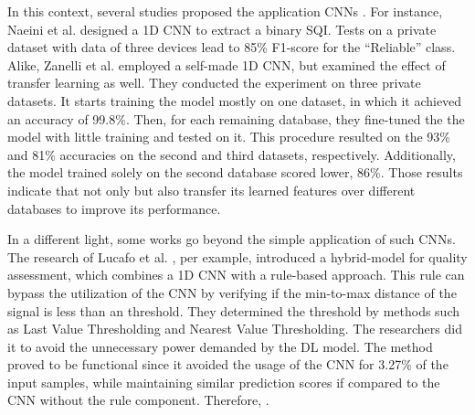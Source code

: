 In this context, several studies proposed the application \glspl{CNN} . For instance, Naeini et al. \cite{deep-learning-1} designed a 1D \gls{CNN} to extract a binary \gls{SQI}. Tests on a private dataset with data of three devices lead to 85\% F1-score for the ``Reliable'' class. Alike, Zanelli et al. \cite{deep-learning-2} employed a self-made 1D \gls{CNN}, but examined the effect of transfer learning as well. They conducted the experiment on three private datasets. It starts training the model mostly on one dataset, in which it achieved an accuracy of 99.8\%. Then, for each remaining database, they fine-tuned the the model with little training and tested on it. This procedure resulted on the 93\% and 81\% accuracies on the second and third datasets, respectively. Additionally, the model trained solely on the second database scored lower, 86\%. Those results indicate that not only  but also  transfer its learned features over different databases to improve its performance.

In a different light, some works go beyond the simple application of such \glspl{CNN}. The research of Lucafo et al. \cite{deep-learning-3}, per example, introduced a hybrid-model for quality assessment, which combines a 1D \gls{CNN} with a rule-based approach. This rule can bypass the utilization of the \gls{CNN} by verifying if the min-to-max distance of the signal is less than an threshold. They determined the threshold by methods such as Last Value Thresholding and Nearest Value Thresholding. The researchers did it to avoid the unnecessary power demanded by the \gls{DL} model. The method proved to be functional since it avoided the usage of the \gls{CNN} for 3.27\% of the input samples, while maintaining similar prediction scores if compared to the \gls{CNN} without the rule component. Therefore, .  

